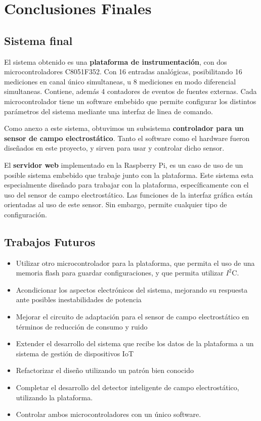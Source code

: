\chapter{Conclusiones Finales} %
\label{cha:conclusiones}

\section{Sistema final} %
\label{sec:sistema_final}

El sistema obtenido es una \textbf{plataforma de instrumentación}, con dos microcontroladores C8051F352. Con 16 entradas analógicas, posibilitando 16 mediciones en canal único simultaneas, u 8 mediciones en modo diferencial simultaneas. Contiene, además 4 contadores de eventos de fuentes externas. Cada microcontrolador tiene un software embebido que permite configurar los distintos parámetros del sistema mediante una interfaz de linea de comando.

Como anexo a este sistema, obtuvimos un subsistema \textbf{controlador para un sensor de campo electrostático}. Tanto el software como el hardware fueron diseñados en este proyecto, y sirven para usar y controlar dicho sensor.

El \textbf{servidor web} implementado en la Raspberry Pi, es un caso de uso de un posible sistema embebido que trabaje junto con la plataforma. Este sistema esta especialmente diseñado para trabajar con la plataforma, específicamente con el uso del sensor de campo electrostático. Las funciones de la interfaz gráfica están orientadas al uso de este sensor. Sin embargo, permite cualquier tipo de configuración.


\section{Trabajos Futuros} %
\label{sec:trabajos_futuros}

\begin{itemize}
	\item Utilizar otro microcontrolador para la plataforma, que permita el uso de una memoria flash para guardar configuraciones, y que permita utilizar $I^{2}$C.
	\item Acondicionar los aspectos electrónicos del sistema, mejorando su respuesta ante posibles inestabilidades de potencia
	\item Mejorar el circuito de adaptación para el sensor de campo electrostático en términos de reducción de consumo y ruido
	\item Extender el desarrollo del sistema que recibe los datos de la plataforma a un sistema de gestión de dispositivos IoT
	\item Refactorizar el diseño utilizando un patrón bien conocido
	\item Completar el desarrollo del detector inteligente de campo electrostático, utilizando la plataforma.
	\item Controlar ambos microcontroladores con un único software.
\end{itemize}




